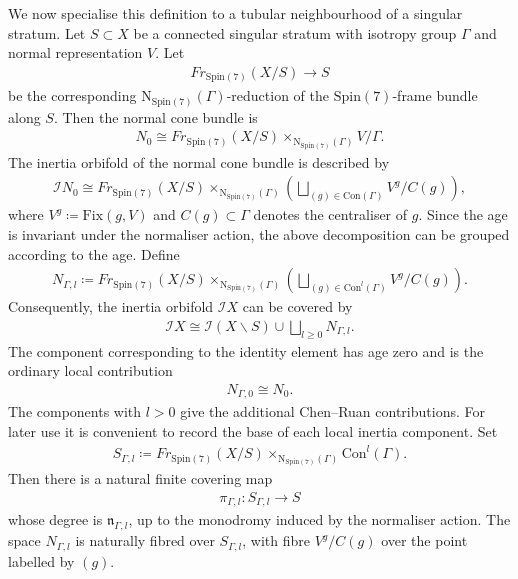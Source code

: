 \documentclass[psamsfonts]{amsart}
\theoremstyle{plain}
\theoremstyle{definition}{
\newtheorem{defi}{Definition}[section]
\newtheorem{ass}{Assumption}
\newtheorem*{nota}{Notation}}
\theoremstyle{remark}{
\newtheorem{rem}{Remark}
\newtheorem{ex}{Example}}
\theoremstyle{plain}{
\newtheorem{thm}{Theorem}[section]
\newtheorem{lem}{Lemma}[section]
\newtheorem{cor}{Corollary}[section]
\newtheorem{prop}{Proposition}[section]
\newtheorem{con}{Conjecture}[section]}
\newcommand{\m}[1]{{\mathrm{#1}}}
\begin{document}
We now specialise this definition to a tubular neighbourhood of a singular
stratum. Let $S\subset X$ be a connected singular stratum with isotropy group
$\Gamma$ and normal representation $V$. Let
\begin{align*}
        Fr_{\m{Spin}(7)}(X/S)\longrightarrow S
\end{align*}
be the corresponding $\m{N}_{\m{Spin}(7)}(\Gamma)$-reduction of the
$\m{Spin}(7)$-frame bundle along $S$. Then the normal cone bundle is
\begin{align*}
        N_0
        \cong
        Fr_{\m{Spin}(7)}(X/S)
        \times_{\m{N}_{\m{Spin}(7)}(\Gamma)}
        V/\Gamma .
\end{align*}
The inertia orbifold of the normal cone bundle is described by
\begin{align*}
        \mathcal{I}N_0
        \cong
        Fr_{\m{Spin}(7)}(X/S)
        \times_{\m{N}_{\m{Spin}(7)}(\Gamma)}
        \left(
            \bigsqcup_{(g)\in\m{Con}(\Gamma)}
            V^g/C(g)
        \right),
\end{align*}
where $V^g\coloneqq \m{Fix}(g,V)$ and $C(g)\subset\Gamma$ denotes the centraliser of $g$. Since the age is invariant under the normaliser action, the above decomposition
can be grouped according to the age. Define
\begin{align*}
        N_{\Gamma,l}
        \coloneqq
        Fr_{\m{Spin}(7)}(X/S)
        \times_{\m{N}_{\m{Spin}(7)}(\Gamma)}
        \left(
            \bigsqcup_{(g)\in\m{Con}^l(\Gamma)}
            V^g/C(g)
        \right).
\end{align*}
Consequently, the inertia orbifold $\mathcal{I}X$ can be covered by 
\begin{align*}
        \mathcal{I}X
        \cong\mathcal{I}(X\backslash S) \cup 
        \bigsqcup_{l\geq 0} N_{\Gamma,l}.
\end{align*}
The component corresponding to the identity element has age zero and is the ordinary local contribution
\begin{align*}
        N_{\Gamma,0}\cong N_0 .
\end{align*}
The components with $l>0$ give the additional Chen--Ruan contributions. For later use it is convenient to record the base of each local inertia component. Set
\begin{align*}
        S_{\Gamma,l}
        \coloneqq
        Fr_{\m{Spin}(7)}(X/S)
        \times_{\m{N}_{\m{Spin}(7)}(\Gamma)}
        \m{Con}^l(\Gamma).
\end{align*}
Then there is a natural finite covering map
\begin{align*}
        \pi_{\Gamma,l}\colon S_{\Gamma,l}\longrightarrow S
\end{align*}
whose degree is $\mathfrak{n}_{\Gamma,l}$, up to the monodromy induced by the normaliser action. The space $N_{\Gamma,l}$ is naturally fibred over $S_{\Gamma,l}$, with fibre $V^g/C(g)$ over the point labelled by $(g)$.
\end{document}
